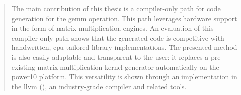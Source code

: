 \documentclass[\main/thesis.tex]{subfiles}
\begin{document}


\begin{quote}
The main contribution of this thesis is a compiler-only path for code generation for the \gls{gemm} operation.
This path leverages hardware support in the form of matrix-multiplication engines.
An evaluation of this compiler-only path shows that the generated code is competitive with handwritten, \gls{cpu}-tailored library implementations.
The presented method is also easily adaptable and transparent to the user: it replaces a pre-existing matrix-multiplication kernel generator automatically on the \gls{power10} platform.
This versatility is shown through an implementation in the \gls{llvm} (), an industry-grade compiler and related tools.
\end{quote}
\end{document}
